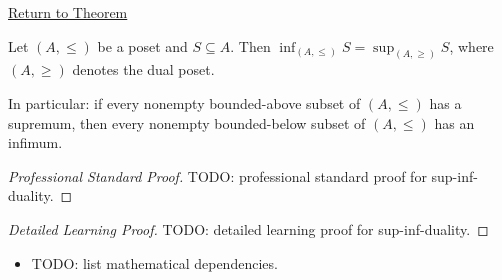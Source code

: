 \newpage
{}
\label{prf:sup-inf-duality}

\begin{remark*}[Return]
\hyperref[prop:sup-inf-duality]{Return to Theorem}
\end{remark*}

\begin{proposition*}
Let $(A, \leq)$ be a poset and $S \subseteq A$.  Then
$\inf_{(A,\leq)} S = \sup_{(A,\geq)} S$,
where $(A,\geq)$ denotes the dual poset.

In particular: if every nonempty bounded-above subset of $(A,\leq)$ has a
supremum, then every nonempty bounded-below subset of $(A,\leq)$ has an
infimum.
\end{proposition*}

\begin{proof}[Professional Standard Proof]
\LRAProofBodyStart
TODO: professional standard proof for sup-inf-duality.
\end{proof}

\begin{proof}[Detailed Learning Proof]
\LRAProofBodyStart
TODO: detailed learning proof for sup-inf-duality.
\end{proof}

\begin{remark*}
\end{remark*}

\begin{dependencies}
\begin{itemize}
  \item TODO: list mathematical dependencies.
\end{itemize}
\end{dependencies}

\clearpage
